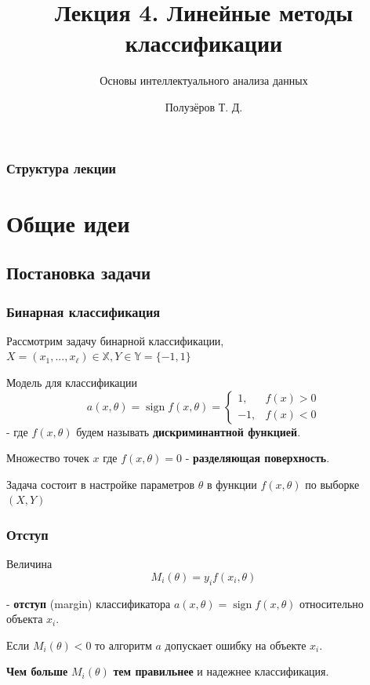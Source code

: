 \documentclass{beamer}
\title[Линейные методы классификации]{Лекция 4. Линейные методы классификации}
\subtitle{Основы интеллектуального анализа данных}
\author{Полузёров Т. Д.}
\institute{БГУ ФПМИ}
\date{}
\DeclareMathOperator{\sign}{sign}
\begin{document}
	
	\begin{frame}
		\titlepage
	\end{frame}
	
	\begin{center}
		\frametitle{Структура лекции}
		\tableofcontents	
	\end{center}
	
	\section{Общие идеи}
	
	\subsection{Постановка задачи}
	
	\begin{frame}
		\frametitle{Бинарная классификация}
		Рассмотрим задачу бинарной классификации, $X=(x_1, ..., x_{\ell}) \in \mathbb{X}, Y \in \mathbb{Y} = \{-1, 1\}$
		
		\vspace{5pt}
		
		Модель для классификации
		\[
		a(x, \theta) 
		= \sign f(x, \theta)
		=
		\begin{cases}
			1,& f(x) > 0 \\
			-1,& f(x) < 0
		\end{cases}
		\]
		- где $f(x, \theta)$
		будем называть \textbf{дискриминантной функцией}.
		
		\vspace{5pt}
		
		Множество точек $x$ где $f(x, \theta) = 0$ - \textbf{разделяющая поверхность}.
		
		\vspace{5pt}
		
		Задача состоит в настройке параметров $\theta$ в функции $f(x, \theta)$ по выборке $(X, Y)$
	\end{frame} 
	
	\begin{frame}
		\frametitle{Отступ}
		
		Величина 
		\[
		M_i(\theta) = y_i f(x_i, \theta)
		\]
		
		 - \textbf{отступ} (margin) классификатора $a(x, \theta) = \sign f(x, \theta)$ относительно объекта $x_i$.
		
		\vspace{15pt}
		
		Если $M_i(\theta) < 0$ то алгоритм $a$ допускает ошибку на объекте $x_i$. 
		
		\vspace{15pt}
		
		\textbf{Чем больше} $M_i(\theta)$ \textbf{тем правильнее} и надежнее классификация.  
	\end{frame}
	
\end{document}
